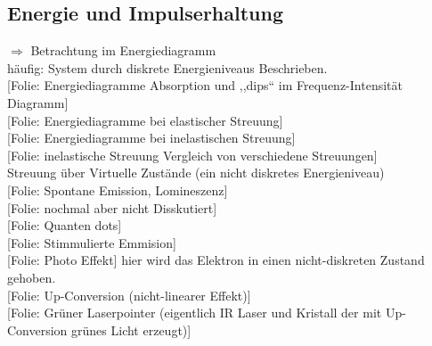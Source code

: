 \documentclass[titlepage,11pt,a4paper,ngerman]{report}
\newcommand{\folie}[1]{\color{gray}[Folie: #1]\color{black}}
\begin{document}
\subsection{Energie und Impulserhaltung}
$ \Rightarrow $ Betrachtung im Energiediagramm\\[5pt]
häufig: System durch diskrete Energieniveaus Beschrieben.\\[5pt]
\folie{Energiediagramme Absorption und ,,dips`` im Frequenz-Intensität Diagramm}\\
\folie{Energiediagramme bei elastischer Streuung}\\
\folie{Energiediagramme bei inelastischen Streuung}\\
\folie{inelastische Streuung Vergleich von verschiedene Streuungen}\\
Streuung über Virtuelle Zustände (ein nicht diskretes Energieniveau)\\
\folie{Spontane Emission, Lomineszenz}\\
\folie{nochmal aber nicht Disskutiert}\\
\folie{Quanten dots}\\
\folie{Stimmulierte Emmision}\\
\folie{Photo Effekt} hier wird das Elektron in einen nicht-diskreten Zustand gehoben.\\
\folie{Up-Conversion (nicht-linearer Effekt)}\\
\folie{Grüner Laserpointer (eigentlich IR Laser und Kristall der mit Up-Conversion grünes Licht erzeugt)}\\
























%
%
\end{document}
